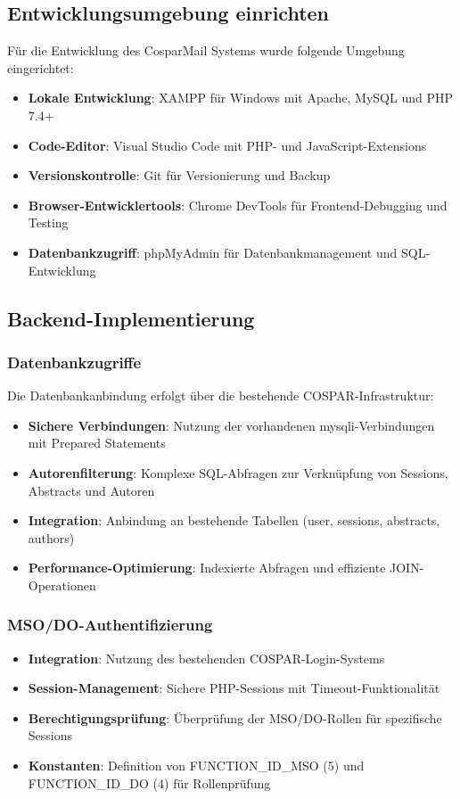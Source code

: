 \documentclass[11pt,a4paper]{article}
\begin{document}
\subsection{Entwicklungsumgebung einrichten}
Für die Entwicklung des CosparMail Systems wurde folgende Umgebung eingerichtet:
\begin{itemize}
    \item \textbf{Lokale Entwicklung}: XAMPP für Windows mit Apache, MySQL und PHP 7.4+
    \item \textbf{Code-Editor}: Visual Studio Code mit PHP- und JavaScript-Extensions
    \item \textbf{Versionskontrolle}: Git für Versionierung und Backup
    \item \textbf{Browser-Entwicklertools}: Chrome DevTools für Frontend-Debugging und Testing
    \item \textbf{Datenbankzugriff}: phpMyAdmin für Datenbankmanagement und SQL-Entwicklung
\end{itemize}

\subsection{Backend-Implementierung}

\subsubsection{Datenbankzugriffe}
Die Datenbankanbindung erfolgt über die bestehende COSPAR-Infrastruktur:
\begin{itemize}
    \item \textbf{Sichere Verbindungen}: Nutzung der vorhandenen mysqli-Verbindungen mit Prepared Statements
    \item \textbf{Autorenfilterung}: Komplexe SQL-Abfragen zur Verknüpfung von Sessions, Abstracts und Autoren
    \item \textbf{Integration}: Anbindung an bestehende Tabellen (user, sessions, abstracts, authors)
    \item \textbf{Performance-Optimierung}: Indexierte Abfragen und effiziente JOIN-Operationen
\end{itemize}

\subsubsection{MSO/DO-Authentifizierung}
\begin{itemize}
    \item \textbf{Integration}: Nutzung des bestehenden COSPAR-Login-Systems
    \item \textbf{Session-Management}: Sichere PHP-Sessions mit Timeout-Funktionalität
    \item \textbf{Berechtigungsprüfung}: Überprüfung der MSO/DO-Rollen für spezifische Sessions
    \item \textbf{Konstanten}: Definition von FUNCTION\_ID\_MSO (5) und FUNCTION\_ID\_DO (4) für Rollenprüfung
\end{itemize}
\end{document}
